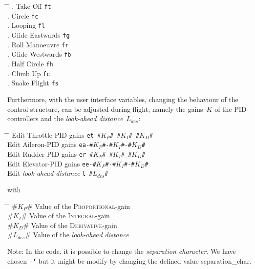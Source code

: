 \documentclass[11pt,a4paper]{scrartcl}		%
\begin{document}
\begin{tabbing}
	\hspace{2cm} \= \hspace{4cm} \= \hspace{3cm} \kill
	. Take Off \> \texttt{ft} \\	
	. Circle \> \texttt{fc} \\	
	. Looping\> \texttt{fl} \\	
	. Glide Eastwards \> \texttt{fg} \\
	. Roll Manoeuvre \> \texttt{fr} \\		
	. Glide Westwards \> \texttt{fb} \\	
	. Half Circle \> \texttt{fh} \\	
	. Climb Up \> \texttt{fc} \\	
	. Snake Flight \> \texttt{fs} \\		
\end{tabbing}



\medskip

Furthermore, with the user interface variables, changing the behaviour of the control structure, can be adjusted during flight, namely the gains~$K$ of the PID-controllers and the \textsl{look-ahead distance}~$L_{des}$:

\begin{tabbing}
	\hspace{2cm} \= \hspace{6cm} \= \hspace{7cm} \kill
	\> Edit Throttle-PID gains \> \texttt{et-\#$K_P$\#-\#$K_I$\#-\#$K_D$\#} \\
	\> Edit Aileron-PID gains \> \texttt{ea-\#$K_P$\#-\#$K_I$\#-\#$K_D$\#} \\
	\> Edit Rudder-PID gains \> \texttt{er-\#$K_P$\#-\#$K_I$\#-\#$K_D$\#} \\
	\> Edit Elevator-PID gains \> \texttt{ee-\#$K_P$\#-\#$K_I$\#-\#$K_D$\#} \\
	\> Edit \textsl{look-ahead distance} \> \texttt{l-\#$L_{des}$\#} 
\end{tabbing} 
with 
\begin{tabbing}
	\hspace{2cm} \= \hspace{3cm} \= \hspace{7cm} \kill
	\> \#$K_P$\# \> Value of the \textsc{Proportional}-gain \\
	\> \#$K_I$\# \> Value of the \textsc{Integral}-gain \\
	\> \#$K_D$\# \> Value of the \textsc{Derivative}-gain \\
	\> \#$L_{des}$\# \> Value of the \textsl{look-ahead distance} \\
\end{tabbing}
\noindent
Note: In the code, it is possible to change the \textsl{separation character}. We have chosen \texttt{\'-\'} but it might be modify by changing the defined value \textsf{separation\_char}.
\end{document}
